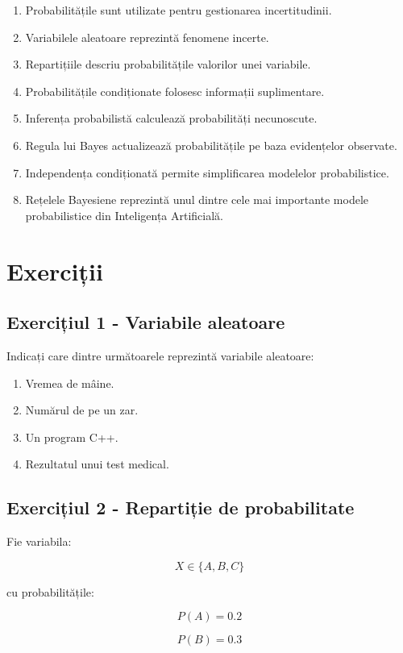 \documentclass[12pt,a4paper]{article}
\begin{document}
\begin{enumerate}
\item Probabilitățile sunt utilizate pentru gestionarea incertitudinii.
\item Variabilele aleatoare reprezintă fenomene incerte.
\item Repartițiile descriu probabilitățile valorilor unei variabile.
\item Probabilitățile condiționate folosesc informații suplimentare.
\item Inferența probabilistă calculează probabilități necunoscute.
\item Regula lui Bayes actualizează probabilitățile pe baza evidențelor observate.
\item Independența condiționată permite simplificarea modelelor probabilistice.
\item Rețelele Bayesiene reprezintă unul dintre cele mai importante modele probabilistice din Inteligența Artificială.
\end{enumerate}

\section{Exerciții}

\subsection{Exercițiul 1 - Variabile aleatoare}

Indicați care dintre următoarele reprezintă variabile aleatoare:

\begin{enumerate}
\item Vremea de mâine.
\item Numărul de pe un zar.
\item Un program C++.
\item Rezultatul unui test medical.
\end{enumerate}

\subsection{Exercițiul 2 - Repartiție de probabilitate}

Fie variabila:

\[
X \in \{A,B,C\}
\]

cu probabilitățile:

\[
P(A)=0.2
\]

\[
P(B)=0.3
\]
\end{document}
